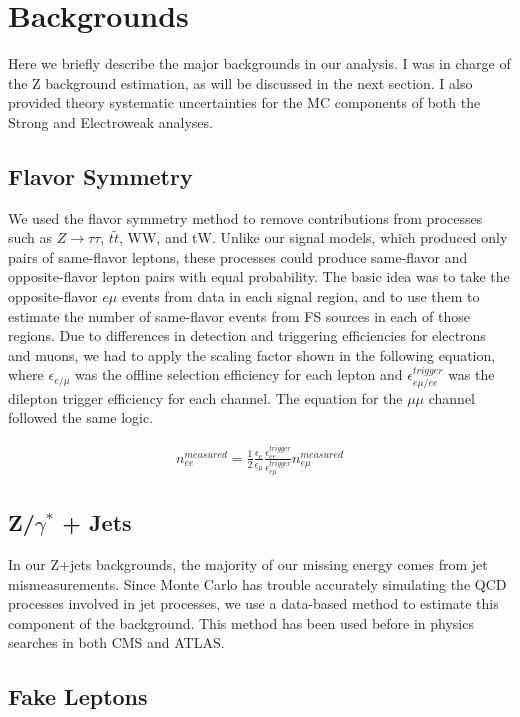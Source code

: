 \section{Backgrounds}

Here we briefly describe the major backgrounds in our analysis. I was in charge of the Z background estimation, as will be discussed in the next section. I also provided theory systematic uncertainties for the MC components of both the Strong and Electroweak analyses.

\subsection*{Flavor Symmetry}

We used the flavor symmetry method to remove contributions from processes such as $Z\rightarrow\tau\tau$, $t\tilde{t}$, WW, and tW. Unlike our signal models, which produced only pairs of same-flavor leptons, these processes could produce same-flavor and opposite-flavor lepton pairs with equal probability. The basic idea was to take the opposite-flavor $e\mu$ events from data in each signal region, and to use them to estimate the number of same-flavor events from FS sources in each of those regions. Due to differences in detection and triggering efficiencies for electrons and muons, we had to apply the scaling factor shown in the following equation, where $\epsilon_{e/\mu}$ was the offline selection efficiency for each lepton and $\epsilon_{e\mu/ee}^{trigger}$ was the dilepton trigger efficiency for each channel. The equation for the $\mu\mu$ channel followed the same logic.

\begin{gather}
n_{ee}^{measured} = \frac{1}{2}\frac{\epsilon_e}{\epsilon_{\mu}}\frac{\epsilon_{ee}^{trigger}}{\epsilon_{e\mu}^{trigger}}n_{e\mu}^{measured}
\end{gather}

\subsection*{Z/$\gamma^*$ + Jets}

In our Z+jets backgrounds, the majority of our missing energy comes from jet mismeasurements. Since Monte Carlo has trouble accurately simulating the QCD processes involved in jet processes, we use a data-based method to estimate this component of the background. This method has been used before in physics searches in both CMS and ATLAS.

\subsection*{Fake Leptons}

